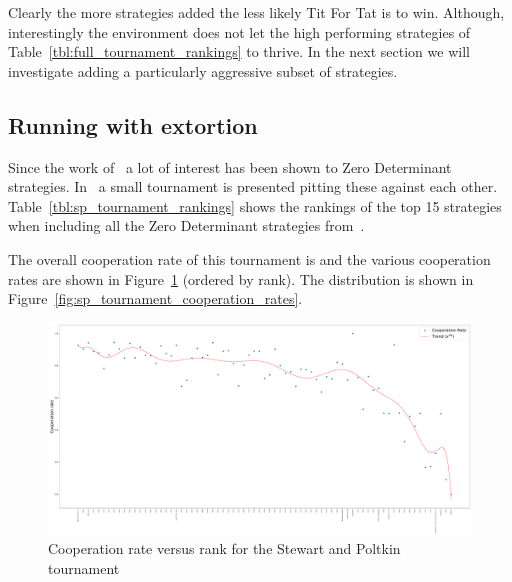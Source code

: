 \documentclass{article}
\begin{document}
\begin{table}[!hbtp]
        \centering
        
        \caption{Proportion of winners of the original tournament with 1, 2 or 3
        new strategies}
        \label{tbl:alternate_extra_strategy_tournament_winner_proportion}
\end{table}

Clearly the more strategies added the less likely Tit For Tat is to win.
Although, interestingly the environment does not let the high performing
strategies of Table~\ref{tbl:full_tournament_rankings} to thrive. In the
next section we will investigate adding a particularly aggressive subset of
strategies.

\subsection{Running with extortion}\label{sec:run_with_stewart_plotkin}

Since the work of~\cite{Press2012} a lot of interest has been shown to Zero
Determinant strategies. In~\cite{Stewart2012} a small tournament is presented
pitting these against each other. Table~\ref{tbl:sp_tournament_rankings}
shows the rankings of the top 15 strategies when including all the Zero
Determinant strategies from~\cite{Stewart2012}.

\begin{table}[!hbtp]
        \centering
        \scriptsize
        
        \caption{Top 15 strategies in the tournament composed of the original
                 strategies and the Zero Determinant strategies
                 from~\cite{Stewart2012}}
        \label{tbl:sp_tournament_rankings}
\end{table}

The overall cooperation rate of this tournament is
and the various
cooperation rates are shown in
Figure~\ref{fig:sp_tournament_cooperation_rate_versus_rank} (ordered by rank).
The distribution is shown in Figure~\ref{fig:sp_tournament_cooperation_rates}.

\begin{figure}[!hbtp]
    \centering
    \includegraphics[width=.8\textwidth]{assets/sp_tournament_cooperation_rate_versus_rank.pdf}
    \caption{Cooperation rate versus rank for the Stewart and Poltkin tournament}
    \label{fig:sp_tournament_cooperation_rate_versus_rank}
\end{figure}
\end{document}
